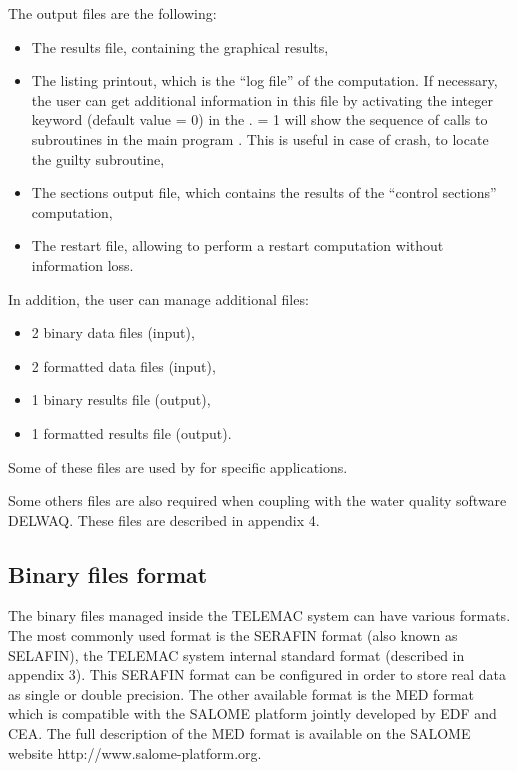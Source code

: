 The output files are the following:

\begin{itemize}
\item The results file, containing the graphical results,

\item The listing printout, which is the ``log file'' of the computation.
If necessary, the user can get additional information in this file by activating
the integer keyword  (default value = 0) in the
.
 = 1 will show the sequence of calls to subroutines in the main
program .
This is useful in case of crash, to locate the guilty subroutine,

\item The sections output file, which contains the results of the
``control sections'' computation,

\item The restart file, allowing to perform a restart computation without
information loss.
\end{itemize}

In addition, the user can manage additional files:

\begin{itemize}
\item 2 binary data files (input),

\item 2 formatted data files (input),

\item 1 binary results file (output),

\item 1 formatted results file (output).
\end{itemize}

Some of these files are used by  for specific applications.

Some others files are also required when coupling  with the water
quality software DELWAQ.
These files are described in appendix 4.


\subsection{Binary files format}
\label{subs:binfile}

The binary files managed inside the TELEMAC system can have various formats.
The most commonly used format is the SERAFIN format (also known as SELAFIN),
the TELEMAC system internal standard format (described in appendix 3).
This SERAFIN format can be configured in order to store real data
as single or double precision.
The other available format is the MED format which is compatible with
the SALOME platform jointly developed by EDF and CEA.
The full description of the MED format is available on the SALOME website
http://www.salome-platform.org.

